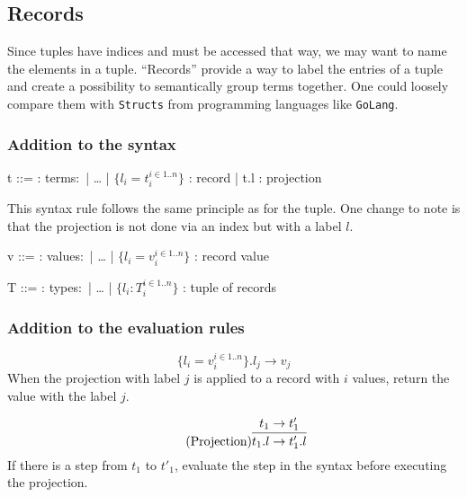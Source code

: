 \subsection{Records}

Since tuples have indices and must be accessed that way, we may want to
name the elements in a tuple. ``Records'' provide a way to label the entries
of a tuple and create a possibility to semantically group terms together.
One could loosely compare them with \texttt{Structs} from programming
languages like \texttt{GoLang}.

\subsubsection{Addition to the syntax \cite{pierce2002ProgLang}}
\begin{bnfgrammar}
    t ::= : terms$\colon$
    | \dots
    | $\{l_i = t_i^{i \in 1..n}\}$ : record
    | t.l : projection
\end{bnfgrammar}\leavevmode\newline
This syntax rule follows the same principle as for the tuple. One change to
note is that the projection is not done via an index but with a label $l$.

\begin{bnfgrammar}
    v ::= : values$\colon$
    | \dots
    | $\{l_i = v_i^{i \in 1..n}\}$ : record value
\end{bnfgrammar}\leavevmode\newline

\begin{bnfgrammar}
    T ::= : types$\colon$
    | \dots
    | $\{l_i \colon T_i^{i \in 1..n}\}$ : tuple of records
\end{bnfgrammar}\leavevmode\newline

\subsubsection{Addition to the evaluation rules \cite{pierce2002ProgLang}}
\begin{equation*}
    \tag{Record projection}
    \{l_i = v_i^{i \in 1..n}\} . l_j \rightarrow v_j
\end{equation*}
When the projection with label $j$ is applied to a record with
$i$ values, return the value with the label $j$.

\begin{equation*}
    \tag{Projection}
    \infer{
        t_1 . l \rightarrow t'_1 . l
    }{
        t_1 \rightarrow t'_1
    }
\end{equation*}
If there is a step from $t_1$ to $t'_1$, evaluate the step
in the syntax before executing the projection.

